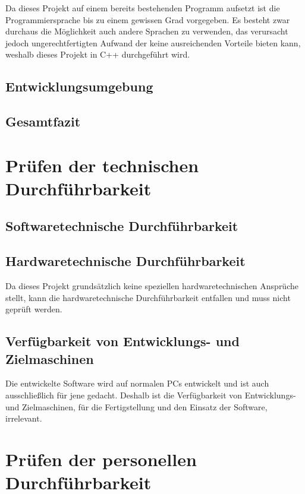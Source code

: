 \documentclass[a4paper,12pt]{scrreprt}
\begin{document}
		Da dieses Projekt auf einem bereits bestehenden Programm aufsetzt ist die Programmiersprache bis zu einem gewissen Grad vorgegeben. Es besteht zwar durchaus die Möglichkeit auch andere Sprachen zu verwenden, das verursacht jedoch ungerechtfertigten Aufwand der keine ausreichenden Vorteile bieten kann, weshalb dieses Projekt in C++ durchgeführt wird.
		
		
		
		\subsection{Entwicklungsumgebung}
		
		\subsection{Gesamtfazit}
			
	\section{Pr\"ufen der technischen Durchf\"uhrbarkeit}
		
		\subsection{Softwaretechnische Durchf\"uhrbarkeit}
			
		\subsection{Hardwaretechnische Durchf\"uhrbarkeit}
			
		Da dieses Projekt grundsätzlich keine speziellen hardwaretechnischen Ansprüche stellt, 
		kann die hardwaretechnische Durchführbarkeit entfallen und muss nicht geprüft werden.
		
			
		\subsection{Verfügbarkeit von Entwicklungs- und Zielmaschinen}
			
		Die entwickelte Software wird auf normalen PCs entwickelt und ist auch ausschließlich für jene gedacht. Deshalb ist die Verfügbarkeit von Entwicklungs- und Zielmaschinen, für die Fertigstellung und den Einsatz der Software, irrelevant.
			
	\section{Pr\"ufen der personellen Durchf\"uhrbarkeit}
		
\end{document}
